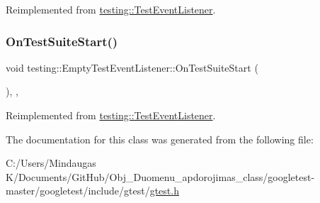 Reimplemented from \mbox{\hyperlink{classtesting_1_1_test_event_listener_a2726cc70dfda861f109355f1d9f09dfe}{testing\+::\+Test\+Event\+Listener}}.

\mbox{\label{classtesting_1_1_empty_test_event_listener_a1e32e4bd4857822b6b50e6900aa5c651}} 
\subsubsection{\texorpdfstring{OnTestSuiteStart()}{OnTestSuiteStart()}\hspace{0.1cm}{\footnotesize\ttfamily [2/2]}}
{\footnotesize\ttfamily void testing\+::\+Empty\+Test\+Event\+Listener\+::\+On\+Test\+Suite\+Start (\begin{DoxyParamCaption}\item[{const \mbox{\hyperlink{classtesting_1_1_test_suite}{Test\+Suite}} \&}]{ }\end{DoxyParamCaption})\hspace{0.3cm}{\ttfamily [inline]}, {\ttfamily [override]}, {\ttfamily [virtual]}}



Reimplemented from \mbox{\hyperlink{classtesting_1_1_test_event_listener_a2726cc70dfda861f109355f1d9f09dfe}{testing\+::\+Test\+Event\+Listener}}.



The documentation for this class was generated from the following file\+:\begin{DoxyCompactItemize}
\item 
C\+:/\+Users/\+Mindaugas K/\+Documents/\+Git\+Hub/\+Obj\+\_\+\+Duomenu\+\_\+apdorojimas\+\_\+class/googletest-\/master/googletest/include/gtest/\mbox{\hyperlink{googletest-master_2googletest_2include_2gtest_2gtest_8h}{gtest.\+h}}\end{DoxyCompactItemize}
